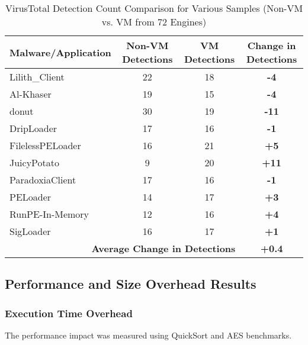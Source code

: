 \begin{table}[H]
    \centering
    \caption{VirusTotal Detection Count Comparison for Various Samples (Non-VM vs. VM from 72 Engines)}
    \label{tab:virustotal_jurnal_ui_ana_en}
    \fontsize{10}{12}\selectfont %
    \begin{tabular}{@{}lccc@{}}
        \toprule
        \textbf{Malware/Application} & \textbf{Non-VM Detections} & \textbf{VM Detections} & \textbf{Change in Detections} \\
        \midrule
        Lilith\_Client    & 22 & 18 & \textbf{-4} \\
        Al-Khaser         & 19 & 15 & \textbf{-4} \\
        donut             & 30 & 19 & \textbf{-11} \\
        DripLoader        & 17 & 16 & \textbf{-1} \\
        FilelessPELoader  & 16 & 21 & \textbf{+5} \\
        JuicyPotato       & 9  & 20 & \textbf{+11} \\
        ParadoxiaClient   & 17 & 16 & \textbf{-1} \\
        PELoader          & 14 & 17 & \textbf{+3} \\
        RunPE-In-Memory   & 12 & 16 & \textbf{+4} \\
        SigLoader         & 16 & 17 & \textbf{+1} \\
        \midrule
        \multicolumn{3}{r}{\textbf{Average Change in Detections}} & \textbf{+0.4} \\
        \bottomrule
    \end{tabular}%
\end{table}

\subsection{Performance and Size Overhead Results}

\subsubsection{Execution Time Overhead}
The performance impact was measured using QuickSort and AES benchmarks.

